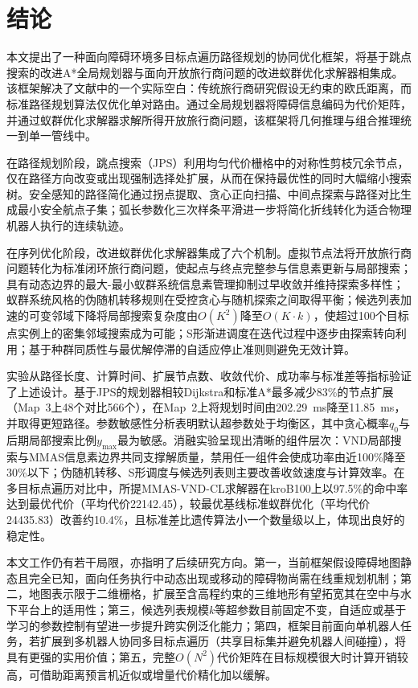 \documentclass[lettersize,journal]{IEEEtran}
\begin{document}
\section{结论}

\label{sec:concl}

本文提出了一种面向障碍环境多目标点遍历路径规划的协同优化框架，将基于跳点搜索的改进A*全局规划器与面向开放旅行商问题的改进蚁群优化求解器相集成。该框架解决了文献中的一个实际空白：传统旅行商研究假设无约束的欧氏距离，而标准路径规划算法仅优化单对路由。通过全局规划器将障碍信息编码为代价矩阵，并通过蚁群优化求解器求解所得开放旅行商问题，该框架将几何推理与组合推理统一到单一管线中。

在路径规划阶段，跳点搜索（JPS）利用均匀代价栅格中的对称性剪枝冗余节点，仅在路径方向改变或出现强制选择处扩展，从而在保持最优性的同时大幅缩小搜索树。安全感知的路径简化通过拐点提取、贪心正向扫描、中间点探索与路径对比生成最小安全航点子集；弧长参数化三次样条平滑进一步将简化折线转化为适合物理机器人执行的连续轨迹。

在序列优化阶段，改进蚁群优化求解器集成了六个机制。虚拟节点法将开放旅行商问题转化为标准闭环旅行商问题，使起点与终点完整参与信息素更新与局部搜索；具有动态边界的最大-最小蚁群系统信息素管理抑制过早收敛并维持探索多样性；蚁群系统风格的伪随机转移规则在受控贪心与随机探索之间取得平衡；候选列表加速的可变邻域下降将局部搜索复杂度由$O(K^2)$降至$O(K \cdot k)$，使超过100个目标点实例上的密集邻域搜索成为可能；S形渐进调度在迭代过程中逐步由探索转向利用；基于种群同质性与最优解停滞的自适应停止准则则避免无效计算。

实验从路径长度、计算时间、扩展节点数、收敛代价、成功率与标准差等指标验证了上述设计。基于JPS的规划器相较Dijkstra和标准A*最多减少83\%的节点扩展（Map~3上48个对比566个），在Map~2上将规划时间由202.29~ms降至11.85~ms，并取得更短路径。参数敏感性分析表明默认超参数处于均衡区，其中贪心概率$q_0$与后期局部搜索比例$y_{\max}$最为敏感。消融实验呈现出清晰的组件层次：VND局部搜索与MMAS信息素边界共同支撑解质量，禁用任一组件会使成功率由近100\%降至30\%以下；伪随机转移、S形调度与候选列表则主要改善收敛速度与计算效率。在多目标点遍历对比中，所提MMAS-VND-CL求解器在kroB100上以97.5\%的命中率达到最优代价（平均代价22142.45），较最优基线标准蚁群优化（平均代价24435.83）改善约10.4\%，且标准差比遗传算法小一个数量级以上，体现出良好的稳定性。

本文工作仍有若干局限，亦指明了后续研究方向。第一，当前框架假设障碍地图静态且完全已知，面向任务执行中动态出现或移动的障碍物尚需在线重规划机制；第二，地图表示限于二维栅格，扩展至含高程约束的三维地形有望拓宽其在空中与水下平台上的适用性；第三，候选列表规模$k$等超参数目前固定不变，自适应或基于学习的参数控制有望进一步提升跨实例泛化能力；第四，框架目前面向单机器人任务，若扩展到多机器人协同多目标点遍历（共享目标集并避免机器人间碰撞），将具有更强的实用价值；第五，完整$O(N^2)$代价矩阵在目标规模很大时计算开销较高，可借助距离预言机近似或增量代价精化加以缓解。
\end{document}

